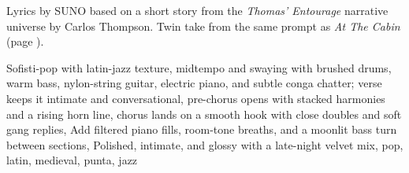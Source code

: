 
\label{sec:moon-at-the-cabin}
\begin{notes}
Lyrics by SUNO based on a short story from the \emph{Thomas’ Entourage} narrative universe by Carlos Thompson. Twin take from the same prompt as \emph{At The Cabin} (page \pageref{sec:at-the-cabin}).
\end{notes}
\begin{style}
Sofisti-pop with latin-jazz texture, midtempo and swaying with brushed drums, warm bass, nylon-string guitar, electric piano, and subtle conga chatter; verse keeps it intimate and conversational, pre-chorus opens with stacked harmonies and a rising horn line, chorus lands on a smooth hook with close doubles and soft gang replies, Add filtered piano fills, room-tone breaths, and a moonlit bass turn between sections, Polished, intimate, and glossy with a late-night velvet mix, pop, latin, medieval, punta, jazz
\end{style}
